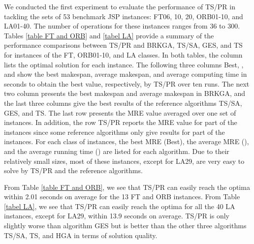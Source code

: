 \documentclass[authoryear,12pt]{elsarticle}
\begin{document}
We conducted the first experiment to evaluate the performance of TS/PR in tackling the sets of 53 benchmark JSP instances: FT06, 10, 20, ORB01-10, and LA01-40. The number of operations for these instances ranges from 36 to 300. Tables \ref{table FT and ORB} and \ref{tabel LA} provide a summary of the performance comparisons between TS/PR and BRKGA, TS/SA, GES, and TS for instances of the FT, ORB01-10, and LA classes. In both tables, the column  lists the optimal solution for each instance. The following three columns Best, , and  show the best makespan, average makespan, and average computing time in seconds to obtain the best value, respectively, by TS/PR over ten runs. The next two column presents the best makespan and average makespan in BRKGA, and the last three columns give the best results of the reference algorithms TS/SA, GES, and TS. The last row presents the MRE value averaged over one set of instances. In addition, the row TS/PR reports the MRE value for part of the instances since some reference algorithms only give results for part of the instances.  For each class of instances, the best MRE (Best), the average MRE (), and the average running time () are listed for each algorithm. Due to their relatively small sizes, most of these instances, except for LA29, are very easy to solve by TS/PR and the reference algorithms.

From Table \ref{table FT and ORB}, we see that TS/PR can easily reach the optima within 2.01 seconds on average for the 13 FT and ORB instances. From Table \ref{tabel LA}, we see that TS/PR can easily reach the optima for all the 40 LA instances, except for LA29, within 13.9 seconds on average. TS/PR is only slightly worse than algorithm GES but is better than the other three algorithms TS/SA, TS, and HGA in terms of solution quality.
\end{document}
